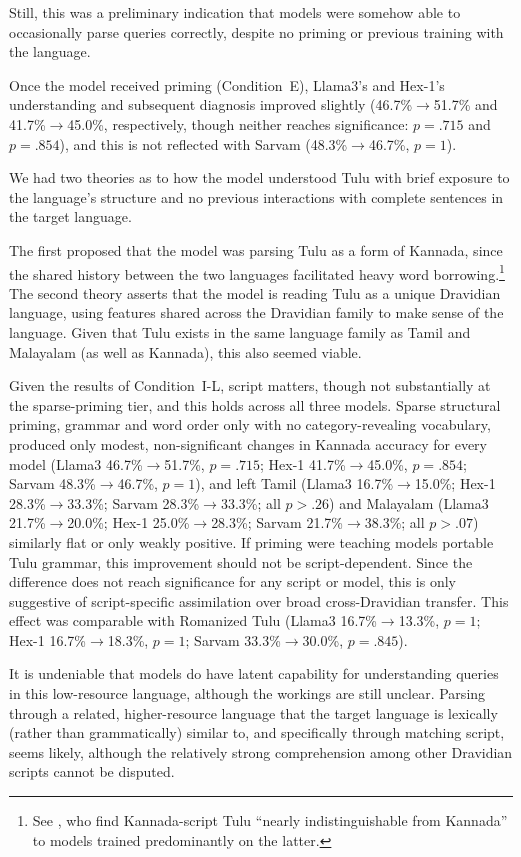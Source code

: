 \documentclass[11pt]{article}
\begin{document}
Still, this was a preliminary indication that models were somehow able to occasionally parse queries correctly, despite no priming or previous training with the language.

Once the model received priming (Condition\ E), Llama3's and Hex-1's understanding and subsequent diagnosis improved slightly (46.7\%$\to$51.7\% and 41.7\%$\to$45.0\%, respectively, though neither reaches significance: $p=.715$ and $p=.854$), and this is not reflected with Sarvam (48.3\%$\to$46.7\%, $p=1$).

We had two theories as to how the model understood Tulu with brief exposure to the language's structure and no previous interactions with complete sentences in the target language.

The first proposed that the model was parsing Tulu as a form of Kannada, since the shared history between the two languages facilitated heavy word borrowing.\footnote{See \cite{devadiga2026making}, who find Kannada-script Tulu ``nearly indistinguishable from Kannada'' to models trained predominantly on the latter.} The second theory asserts that the model is reading Tulu as a unique Dravidian language, using features shared across the Dravidian family to make sense of the language. Given that Tulu exists in the same language family as Tamil and Malayalam (as well as Kannada), this also seemed viable.

Given the results of Condition\ I-L, script matters, though not substantially at the sparse-priming tier, and this holds across all three models. Sparse structural priming, grammar and word order only with no category-revealing vocabulary, produced only modest, non-significant changes in Kannada accuracy for every model (Llama3 46.7\%$\to$51.7\%, $p=.715$; Hex-1 41.7\%$\to$45.0\%, $p=.854$; Sarvam 48.3\%$\to$46.7\%, $p=1$), and left Tamil (Llama3 16.7\%$\to$15.0\%; Hex-1 28.3\%$\to$33.3\%; Sarvam 28.3\%$\to$33.3\%; all $p>.26$) and Malayalam (Llama3 21.7\%$\to$20.0\%; Hex-1 25.0\%$\to$28.3\%; Sarvam 21.7\%$\to$38.3\%; all $p>.07$) similarly flat or only weakly positive. If priming were teaching models portable Tulu grammar, this improvement should not be script-dependent. Since the difference does not reach significance for any script or model, this is only suggestive of script-specific assimilation over broad cross-Dravidian transfer. This effect was comparable with Romanized Tulu (Llama3 16.7\%$\to$13.3\%, $p=1$; Hex-1 16.7\%$\to$18.3\%, $p=1$; Sarvam 33.3\%$\to$30.0\%, $p=.845$).

It is undeniable that models do have latent capability for understanding queries in this low-resource language, although the workings are still unclear. Parsing through a related, higher-resource language that the target language is lexically (rather than grammatically) similar to, and specifically through matching script, seems likely, although the relatively strong comprehension among other Dravidian scripts cannot be disputed.
\end{document}
